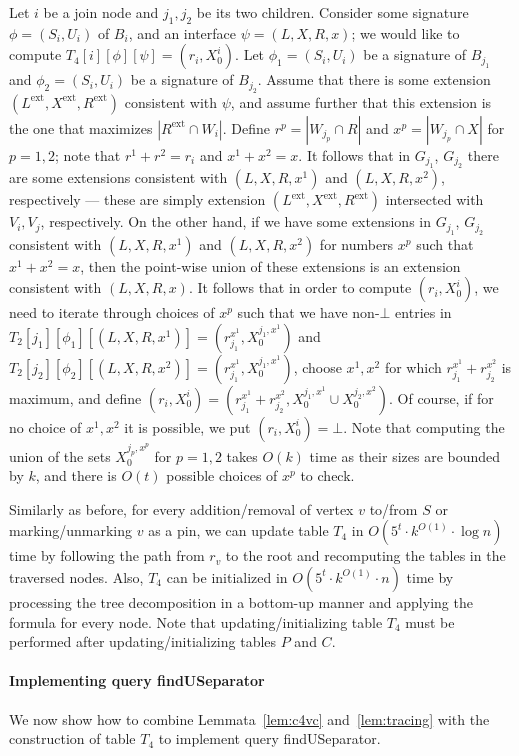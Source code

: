 \documentclass[a4paper,11pt]{article}
\theoremstyle{definition}
\theoremstyle{remark}
\newcommand{\qUsep}{\textnormal{findUSeparator}}
\newcommand{\ext}{\textrm{ext}}
\begin{document}
 Let $i$ be a join node and
$j_1,j_2$ be its two children.  Consider some signature
$\phi=(S_i,U_i)$ of $B_i$, and an interface $\psi=(L,X,R,x)$; we would
like to compute $T_4[i][\phi][\psi]=(r_i,X_0^i)$.  Let
$\phi_1=(S_i,U_i)$ be a signature of $B_{j_1}$ and $\phi_2=(S_i,U_i)$
be a signature of $B_{j_2}$.  Assume that there is some extension
$(L^{\ext}, X^{\ext}, R^{\ext})$ consistent with $\psi$, and assume
further that this extension is the one that maximizes $|R^{\ext}\cap
W_i|$.  Define $r^p=|W_{j_p}\cap R|$ and $x^p=|W_{j_p}\cap X|$ for
$p=1,2$; note that $r^1+r^2=r_i$ and $x^1+x^2=x$.  It follows that in
$G_{j_1}$, $G_{j_2}$ there are some extensions consistent with
$(L,X,R,x^1)$ and $(L,X,R,x^2)$, respectively --- these are simply
extension $(L^{\ext}, X^{\ext}, R^{\ext})$ intersected with $V_i,V_j$,
respectively.  On the other hand, if we have some extensions in
$G_{j_1}$, $G_{j_2}$ consistent with $(L,X,R,x^1)$ and $(L,X,R,x^2)$
for numbers $x^p$ such that $x^1+x^2=x$, then the point-wise union of
these extensions is an extension consistent with $(L,X,R,x)$.  It
follows that in order to compute $(r_i,X^i_0)$, we need to iterate
through choices of $x^p$ such that we have non-$\bot$ entries in
$T_2[j_1][\phi_1][(L,X,R,x^1)]=(r^{x^1}_{j_1},X^{j_1,x^1}_0)$ and
$T_2[j_2][\phi_2][(L,X,R,x^2)]=(r^{x^1}_{j_1},X^{j_1,x^1}_0)$, choose
$x^1,x^2$ for which $r^{x^1}_{j_1}+r^{x^2}_{j_2}$ is maximum, and
define $(r_i,X_0^i)=(r^{x^1}_{j_1}+r^{x^2}_{j_2},X^{j_1,x^1}_0\cup
X^{j_2,x^2}_0)$.  Of course, if for no choice of $x^1,x^2$ it is
possible, we put $(r_i,X_0^i)=\bot$.  Note that computing the union of
the sets $X^{j_p,x^p}_0$ for $p=1,2$ takes $O(k)$ time as their sizes
are bounded by $k$, and there is $O(t)$ possible choices of $x^p$ to
check.

\vskip 0.3cm

Similarly as before, for every addition/removal of vertex $v$ to/from
$S$ or marking/unmarking $v$ as a pin, we can update table $T_4$ in
$O(5^t\cdot k^{O(1)}\cdot \log n)$ time by following the path from
$r_v$ to the root and recomputing the tables in the traversed nodes.
Also, $T_4$ can be initialized in $O(5^t\cdot k^{O(1)}\cdot n)$ time
by processing the tree decomposition in a bottom-up manner and
applying the formula for every node.  Note that updating/initializing
table $T_4$ must be performed after updating/initializing tables $P$
and $C$.

\paragraph{Implementing query \qUsep}
We now show how to combine Lemmata~\ref{lem:c4vc}
and~\ref{lem:tracing} with the construction of table $T_4$ to
implement query \qUsep.
\end{document}
